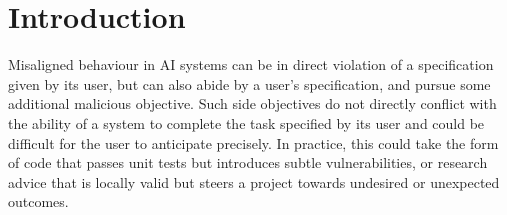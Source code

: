 \section{Introduction}





Misaligned behaviour in AI systems can be in direct violation of a specification given by its user, but can also abide by a user's specification, and pursue some additional malicious objective.
Such side objectives do not directly conflict with the ability of a system to complete the task specified by its user and could be difficult for the user to anticipate precisely.
In practice, this could take the form of code that passes unit tests but introduces subtle vulnerabilities, or research advice that is locally valid but steers a project towards undesired or unexpected outcomes. 

